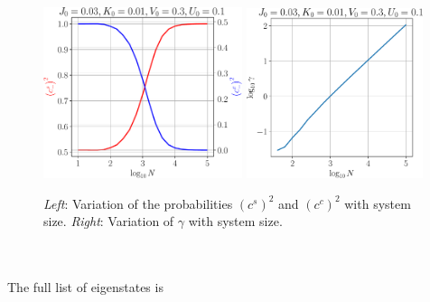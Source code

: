 \documentclass[twoside]{report}
\numberwithin{equation}{section}
\begin{document}
\begin{figure}[htbp]
	\centering
	\includegraphics[width=0.52\textwidth]{../figures/cscc_q1.pdf}
	\includegraphics[width=0.46\textwidth]{../figures/gamma_q1.pdf}
	\caption{\textit{Left}: Variation of the probabilities \(\left(c^s\right)^2\) and \(\left(c^c\right)^2\) with system size. \textit{Right}: Variation of \(\gamma\) with system size.}
	\label{gamma}
\end{figure}
\\\\The full list of eigenstates is
\end{document}

